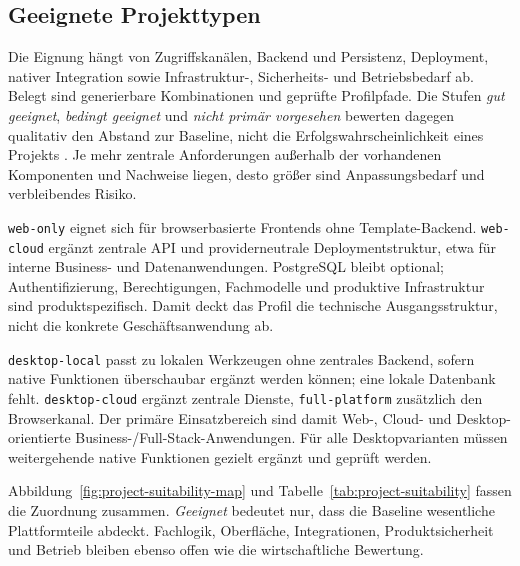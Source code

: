 \subsection{Geeignete Projekttypen}
\label{subsec:geeignete-projekttypen}

Die Eignung hängt von Zugriffskanälen, Backend und Persistenz, Deployment,
nativer Integration sowie Infrastruktur-, Sicherheits- und Betriebsbedarf ab.
Belegt sind generierbare Kombinationen und geprüfte Profilpfade. Die Stufen
\emph{gut geeignet}, \emph{bedingt geeignet} und \emph{nicht primär
vorgesehen} bewerten dagegen qualitativ den Abstand zur Baseline, nicht die
Erfolgswahrscheinlichkeit eines Projekts
\parencite{kleiveist2026profiles,kleiveist2026acceptance}.
Je mehr zentrale Anforderungen außerhalb der vorhandenen Komponenten und
Nachweise liegen, desto größer sind Anpassungsbedarf und verbleibendes Risiko.

\texttt{web-only} eignet sich für browserbasierte Frontends ohne
Template-Backend. \texttt{web-cloud} ergänzt zentrale API und providerneutrale
Deploymentstruktur, etwa für interne Business- und Datenanwendungen.
PostgreSQL bleibt optional; Authentifizierung, Berechtigungen, Fachmodelle und
produktive Infrastruktur sind produktspezifisch.
Damit deckt das Profil die technische Ausgangsstruktur, nicht die konkrete
Geschäftsanwendung ab.

\texttt{desktop-local} passt zu lokalen Werkzeugen ohne zentrales Backend,
sofern native Funktionen überschaubar ergänzt werden können; eine lokale
Datenbank fehlt. \texttt{desktop-cloud} ergänzt zentrale Dienste,
\texttt{full-platform} zusätzlich den Browserkanal. Der primäre Einsatzbereich
sind damit Web-, Cloud- und Desktop-orientierte Business-/Full-Stack-Anwendungen.
Für alle Desktopvarianten müssen weitergehende native Funktionen gezielt
ergänzt und geprüft werden.



Abbildung~\ref{fig:project-suitability-map} und
Tabelle~\ref{tab:project-suitability} fassen die Zuordnung zusammen.
\emph{Geeignet} bedeutet nur, dass die Baseline wesentliche Plattformteile
abdeckt. Fachlogik, Oberfläche, Integrationen, Produktsicherheit und Betrieb
bleiben ebenso offen wie die wirtschaftliche Bewertung.


